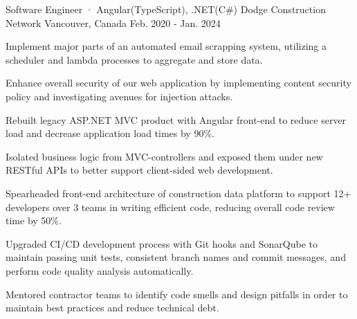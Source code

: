 

\begin{cventries}

\cventry
  {Software Engineer · Angular(TypeScript), .NET(C\#)} %
  {Dodge Construction Network} %
  {Vancouver, Canada} %
  {Feb. 2020 - Jan. 2024} %
  {
    \begin{cvitems} %
      \item {Implement major parts of an automated email scrapping system, utilizing a scheduler and lambda processes to aggregate and store data. }
      \item {Enhance overall security of our web application by implementing content security policy and investigating avenues for injection attacks. }
      \item {Rebuilt legacy ASP.NET MVC product with Angular front-end to reduce server load and decrease application load times by 90\%.}
      \item {Isolated business logic from MVC-controllers and exposed them under new RESTful APIs to better support client-sided web development.}
      \item {Spearheaded front-end architecture of construction data platform to support 12+ developers over 3 teams in writing efficient code, reducing overall code review time by 50\%.}
      \item {Upgraded CI/CD development process with Git hooks and SonarQube to maintain passing unit tests, consistent branch names and commit messages, and perform code quality analysis automatically.}
      \item {Mentored contractor teams to identify code smells and design pitfalls in order to maintain best practices and reduce technical debt.}
    \end{cvitems}
  }


\end{cventries}

